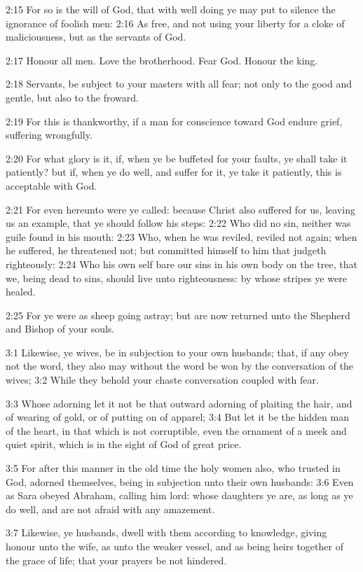 2:15 For so is the will of God, that with well doing ye may put to silence the ignorance of foolish men: 2:16 As free, and not using your liberty for a cloke of maliciousness, but as the servants of God.

2:17 Honour all men. Love the brotherhood. Fear God. Honour the king.

2:18 Servants, be subject to your masters with all fear; not only to the good and gentle, but also to the froward.

2:19 For this is thankworthy, if a man for conscience toward God endure grief, suffering wrongfully.

2:20 For what glory is it, if, when ye be buffeted for your faults, ye shall take it patiently? but if, when ye do well, and suffer for it, ye take it patiently, this is acceptable with God.

2:21 For even hereunto were ye called: because Christ also suffered for us, leaving us an example, that ye should follow his steps: 2:22 Who did no sin, neither was guile found in his mouth: 2:23 Who, when he was reviled, reviled not again; when he suffered, he threatened not; but committed himself to him that judgeth righteously: 2:24 Who his own self bare our sins in his own body on the tree, that we, being dead to sins, should live unto righteousness: by whose stripes ye were healed.

2:25 For ye were as sheep going astray; but are now returned unto the Shepherd and Bishop of your souls.

3:1 Likewise, ye wives, be in subjection to your own husbands; that, if any obey not the word, they also may without the word be won by the conversation of the wives; 3:2 While they behold your chaste conversation coupled with fear.

3:3 Whose adorning let it not be that outward adorning of plaiting the hair, and of wearing of gold, or of putting on of apparel; 3:4 But let it be the hidden man of the heart, in that which is not corruptible, even the ornament of a meek and quiet spirit, which is in the sight of God of great price.

3:5 For after this manner in the old time the holy women also, who trusted in God, adorned themselves, being in subjection unto their own husbands: 3:6 Even as Sara obeyed Abraham, calling him lord: whose daughters ye are, as long as ye do well, and are not afraid with any amazement.

3:7 Likewise, ye husbands, dwell with them according to knowledge, giving honour unto the wife, as unto the weaker vessel, and as being heirs together of the grace of life; that your prayers be not hindered.

